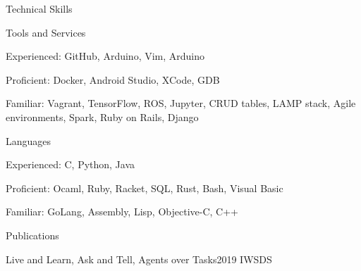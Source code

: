 \documentclass{resume} %
\begin{document}

\begin{rSection}{Technical Skills}

\begin{rSubsection}{Tools and Services}{}{}{}
\item Experienced: GitHub, Arduino, Vim, Arduino
\item Proficient: Docker, Android Studio, XCode, GDB
\item Familiar: Vagrant, TensorFlow, ROS, Jupyter, CRUD tables, LAMP stack, Agile environments, Spark, Ruby on Rails, Django
\end{rSubsection}

\begin{rSubsection}{Languages}{}{}{}
\item Experienced: C, Python, Java
\item Proficient: Ocaml, Ruby, Racket, SQL, Rust, Bash, Visual Basic
\item Familiar: GoLang, Assembly, Lisp, Objective-C, C++
\end{rSubsection}

\end{rSection}
\begin{rSection}{Publications}
\begin{rSubsection}{Live and Learn, Ask and Tell, Agents over Tasks}{}{2019 IWSDS }{}
\end{rSubsection}
\end{rSection}
\end{document}
